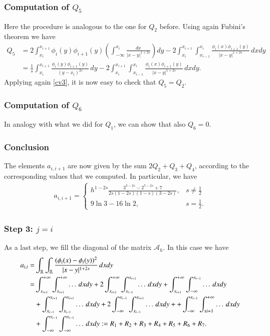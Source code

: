 {\subsubsection*{Computation of $Q_5$}
Here the procedure is analogous to the one for $Q_2$ before. Using again Fubini's theorem we have
\begin{align*}
	Q_5 &= 2\int_{x_i}^{x_{i+1}}\phi_i(y)\phi_{i+1}(y)\left(\int_{-\infty}^{x_i} \frac{dx}{|x-y|^{1+2s}}\right)dy - 2\int_{x_i}^{x_{i+1}}\int_{x_{i-1}}^{x_i} \frac{\phi_i(x)\phi_{i+1}(y)}{|x-y|^{1+2s}}\,dxdy 
	\\
	&= \frac{1}{s}\int_{x_i}^{x_{i+1}}\frac{\phi_i(y)\phi_{i+1}(y)}{(y-x_i)^{2s}}\,dy - 2\int_{x_i}^{x_{i+1}}\int_{x_{i-1}}^{x_i} \frac{\phi_i(x)\phi_{i+1}(y)}{|x-y|^{1+2s}}\,dxdy. 
\end{align*}
Applying again \eqref{cv3}, it is now easy to check that $Q_5=Q_2$.

\subsubsection*{Computation of $Q_6$}
In analogy with what we did for $Q_1$, we can show that also $Q_6=0$.

\subsubsection*{Conclusion}
The elements $a_{i,i+1}$ are now given by the sum $2Q_2+Q_3+Q_4$, according to the corresponding values that we computed. In particular, we have
\begin{align}\label{Aii1}
	a_{i,i+1} = \begin{cases}
					\displaystyle h^{1-2s}\frac{3^{3-2s}-2^{5-2s}+7}{2s(1-2s)(1-s)(3-2s)}, & \displaystyle s\neq \frac{1}{2}
					\\
					9\ln 3-16\ln 2, & \displaystyle s=\frac{1}{2}.
				\end{cases}	
\end{align}

\subsubsection*{Step 3: $j= i$}
As a last step, we fill the diagonal of the matrix $\mathcal A_h$. In this case we have
	\begin{align*}
	a_{i,i}= & \int_{\mathbb{R}}\int_{\mathbb{R}}\frac{(\phi_i(x)-\phi_i(y))^2}{|x-y|^{1+2s}}\,dxdy
	\\
	= & \int_{x_{i+1}}^{+\infty}\int_{x_{i+1}}^{+\infty} \ldots\,dxdy + 2\int_{x_{i+1}}^{+\infty}\int_{x_{i-1}}^{x_{i+1}} \ldots\,dxdy + \int_{x_{i+1}}^{+\infty}\int_{-\infty}^{x_{i-1}} \ldots\,dxdy 
	\\
	& + \int_{x_{i-1}}^{x_{i+1}}\int_{x_{i-1}}^{x_{i+1}} \ldots\,dxdy + 2\int_{-\infty}^{x_{i-1}}\int_{x_{i-1}}^{x_{i+1}} \ldots\,dxdy + + \int_{-\infty}^{x_{i-1}}\int_{x{i+1}}^{+\infty} \ldots\,dxdy 
	\\
	& +  \int_{-\infty}^{x_{i-1}}\int_{-\infty}^{x_{i-1}} \ldots\,dxdy := R_1 + R_2 + R_3 + R_4 + R_5 + R_6 + R_7.
\end{align*}

}
